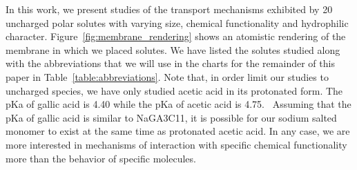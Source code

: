 \documentclass[journal=jpcbfk,manuscript=article]{achemso}
\begin{document}
  In this work, we present studies of the transport mechanisms exhibited by 20 
  uncharged polar solutes with varying size, chemical functionality and hydrophilic 
  character. Figure~\ref{fig:membrane_rendering} shows an atomistic rendering of
  the membrane in which we placed solutes. We have listed the solutes studied along with the abbreviations that
  we will use in the charts for the remainder of this paper in Table~\ref{table:abbreviations}.
  Note that, in order limit our studies to uncharged species, we have only studied
  acetic acid in its protonated form. The pKa of gallic acid is 4.40 while the
  pKa of acetic acid is 4.75.~\cite{chuysinuan_gallic_2009,perrin_pka_1981} 
  Assuming that the pKa of gallic acid is similar to NaGA3C11, it is possible
  for our sodium salted monomer to exist at the same time as protonated acetic
  acid. In any case, we are more interested in mechanisms of interaction with
  specific chemical functionality more than the behavior of specific molecules.
\end{document}
